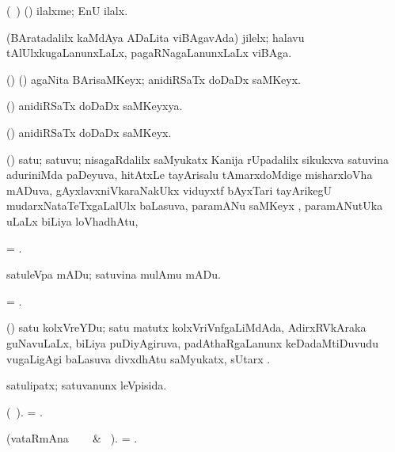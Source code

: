 \bentry
{} 
\gl{\nA}
\bmng
(\kanmu\ \ame) (\ashi) ilalxme; EnU ilalx.
\emng
\eentry

\bentry
{} 
\gl{\nA} 
\bmng
(BAratadalilx kaMdAya ADaLita viBAgavAda) jilelx; halavu  tAlUlxkugaLanunxLaLx, pagaRNagaLanunxLaLx viBAga.
\emng
\eentry

\bentry
{} 
\gl{\nA}  
\bmng
(\ame) (\AmA) agaNita BArisaMKeyx; anidiRSaTx doDaDx saMKeyx.
\emng
\eentry

\bentry
{} 
\gl{\gu}  
\bmng
(\ame) anidiRSaTx doDaDx saMKeyxya.
\emng
\eentry

\bentry
{} 
\gl{\nA}  
\bmng
(\ame) anidiRSaTx doDaDx saMKeyx.
\emng
\eentry

\bentry
{} 
\gl{\nA}
\bmng
(\ravi) satu; satuvu; nisagaRdalilx saMyukatx Kanija rUpadalilx sikukxva satuvina aduriniMda paDeyuva,  hitAtxLe tayArisalu tAmarxdoMdige misharxloVha mADuva, gAyxlavxniVkaraNakUkx viduyxtf bAyxTari tayArikegU mudarxNataTeTxgaLalUlx baLasuva, paramANu saMKeyx , paramANutUka  uLaLx biLiya loVhadhAtu, \saMkeV\  
\emng

\noindent
\gl{\pagu} 
\bmng
{} 
 = .
\emng
\eentry

\bentry
{} 
\gl{\sakirx} 
\bmng
satuleVpa mADu; satuvina mulAmu mADu.
\emng
\eentry

\bentry
{}  
\gl{\nA} 
\bmng
= .
\emng
\eentry

\bentry
{}  
\gl{\nA} 
\bmng
(\ravi) satu kolxVreYDu; satu matutx kolxVriVnfgaLiMdAda, AdirxRVkAraka guNavuLaLx, biLiya puDiyAgiruva, padAthaRgaLanunx keDadaMtiDuvudu \mo vugaLigAgi baLasuva divxdhAtu saMyukatx, sUtarx  .
\emng
\eentry

\bentry
{} 
\gl{\gu}
\bmng
satulipatx; satuvanunx leVpisida.
\emng
\eentry

\bentry
{} 
\gl{\nA} 
\bmng
(\bava\ ). 
= .
\emng
\eentry

\bentry
{} 
\gl{\sakirx} 
\bmng
(vataRmAna \parxpu\ \Eva\   \BU\ \& \BUkaq\ ).  
= .
\emng
\eentry

